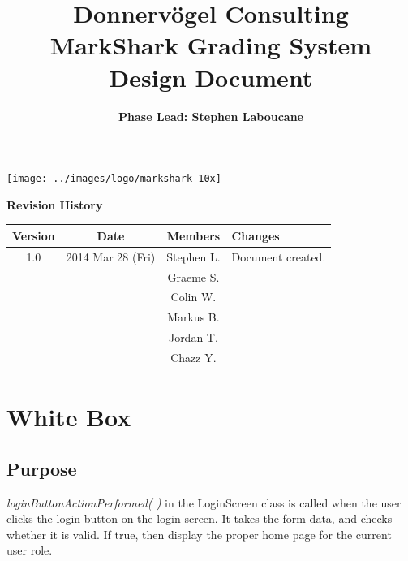 \documentclass{article}
\begin{document}
\title{Donnervögel Consulting \\ MarkShark Grading System \\ Design Document}
\author{\textbf{Phase Lead: Stephen Laboucane}}
\maketitle
\centerline{\texttt{[image: ../images/logo/markshark-10x]}}
\clearpage

\textbf{Revision History}
\begin{center}
  \begin{tabular}{| c | c | c | l |}
    \hline
    Version & Date & Members & Changes\\
    \hline
    1.0 & 2014 Mar 28 (Fri) & Stephen L. & Document created.\\
    & & Graeme S. & \\
    & & Colin W. &\\
    & & Markus B.&\\
    & & Jordan T. &\\
    & & Chazz Y. &\\
    \hline
  \end{tabular}
\end{center}
\clearpage

\tableofcontents
\clearpage

\section{White Box} 
\subsection{Purpose}
\textit{loginButtonActionPerformed( )} in the LoginScreen class is called when the user clicks the login button on the login screen.  It takes the form data, and checks whether it is valid.  If true, then display the proper home page for the current user role.
\end{document}
